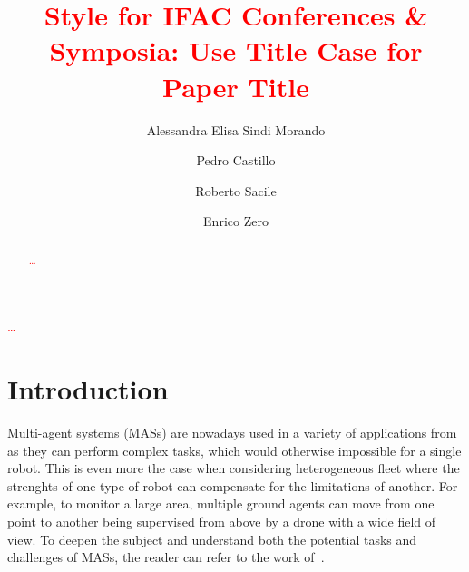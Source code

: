 \documentclass{ifacconf}
\begin{document}
\begin{frontmatter}

\title{\textcolor{red}{Style for IFAC Conferences \& Symposia: Use Title Case for
  Paper Title}} 

\author[First,Second]{Alessandra Elisa Sindi Morando} 
\author[Second]{Pedro Castillo} 
\author[First]{Roberto Sacile}
\author[First]{Enrico Zero}

\address[First]{
   \textit{University of Genoa}, Genoa, Italy \\
   alessandra.elisa.sindi.morando@edu.unige.it, roberto.sacile@unige.it, enrico.zero@dibris.unige.it
}
\address[Second]{
   \textit{Université de technologie de Compiègne}, CNRS, Heudiasyc, Compiègne, France \\
   alessandra-elisa-sindi.morando@utc.fr, pedro.castillo@hds.utc.fr
}

\begin{abstract}                %
\textcolor{red}{\dots}
\end{abstract}

\begin{keyword}
   \textcolor{red}{\dots}
\end{keyword}

\end{frontmatter}

\section{Introduction}
Multi-agent systems (MASs) are nowadays used in a variety of applications from as
they can perform complex tasks, which would otherwise impossible for a single robot.
This is even more the case when considering heterogeneous fleet where the strenghts
of one type of robot can compensate for the limitations of another.
For example, to monitor a large area, multiple ground agents can move from one point 
to another being supervised from above by a drone with a wide field of view.
To deepen the subject and understand both the potential tasks and challenges of MASs,
the reader can refer to the work of~\cite{Maldonado2024}.
\end{document}
